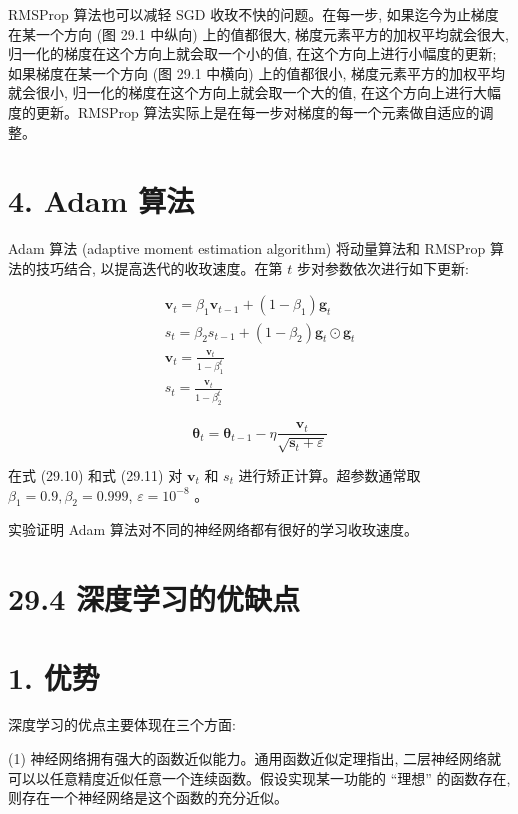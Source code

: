 \documentclass[10pt]{article}
\begin{document}
RMSProp 算法也可以减轻 SGD 收玫不快的问题。在每一步, 如果迄今为止梯度在某一个方向 (图 29.1 中纵向) 上的值都很大, 梯度元素平方的加权平均就会很大, 归一化的梯度在这个方向上就会取一个小的值, 在这个方向上进行小幅度的更新; 如果梯度在某一个方向 (图 29.1 中横向) 上的值都很小, 梯度元素平方的加权平均就会很小, 归一化的梯度在这个方向上就会取一个大的值, 在这个方向上进行大幅度的更新。RMSProp 算法实际上是在每一步对梯度的每一个元素做自适应的调整。

\section*{4. Adam 算法}
Adam 算法 (adaptive moment estimation algorithm) 将动量算法和 RMSProp 算法的技巧结合, 以提高迭代的收玫速度。在第 $t$ 步对参数依次进行如下更新:


\begin{gather*}
\boldsymbol{v}_{t}=\beta_{1} \boldsymbol{v}_{t-1}+\left(1-\beta_{1}\right) \boldsymbol{g}_{t}  \tag{29.8}\\
s_{t}=\beta_{2} s_{t-1}+\left(1-\beta_{2}\right) \boldsymbol{g}_{t} \odot \boldsymbol{g}_{t}  \tag{29.9}\\
\boldsymbol{v}_{t}=\frac{\boldsymbol{v}_{t}}{1-\beta_{1}^{t}}  \tag{29.10}\\
s_{t}=\frac{\boldsymbol{v}_{t}}{1-\beta_{2}^{t}} \tag{29.11}
\end{gather*}



\begin{equation*}
\boldsymbol{\theta}_{t}=\boldsymbol{\theta}_{t-1}-\eta \frac{\boldsymbol{v}_{t}}{\sqrt{\boldsymbol{s}_{t}+\varepsilon}} \tag{29.12}
\end{equation*}


在式 (29.10) 和式 (29.11) 对 $\boldsymbol{v}_{t}$ 和 $s_{t}$ 进行矫正计算。超参数通常取 $\beta_{1}=0.9, \beta_{2}=0.999$, $\varepsilon=10^{-8}$ 。

实验证明 Adam 算法对不同的神经网络都有很好的学习收玫速度。

\section*{29.4 深度学习的优缺点}
\section*{1. 优势}
深度学习的优点主要体现在三个方面:

(1) 神经网络拥有强大的函数近似能力。通用函数近似定理指出, 二层神经网络就可以以任意精度近似任意一个连续函数。假设实现某一功能的 “理想” 的函数存在, 则存在一个神经网络是这个函数的充分近似。
\end{document}
